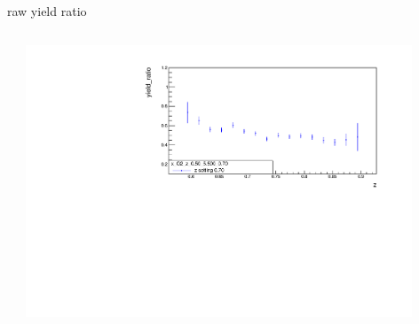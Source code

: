 \begin{frame}{raw yield ratio}
\begin{columns}
\begin{column}[T]{0.5\textwidth}
\end{column}
\begin{column}[T]{0.5\textwidth}
\includegraphics[width = 0.9\textwidth]{results/yield/statistics/x_Q2_z_0.50_5.500_0.70_ratio.pdf}
\end{column}
\end{columns}
\end{frame}
